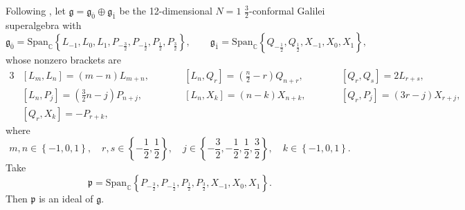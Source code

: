 \documentclass[12pt,reqno]{article}
\def\o{\overline}
\def\F{\mathfrak}
\def\r{\mathrm}
\def\CC{\mathbb{C}}
\def\beqn{\begin{equation*}}
\def\eeqn{\end{equation*}}
\begin{document}
Following \cite{GM}, let $\F{g}=\F{g}_{\o{0}}\oplus\F{g}_{\o{1}}$ be the 12-dimensional $N=1$ $\frac{3}{2}$-conformal Galilei superalgebra with
\beqn
\F{g}_{\bar{0}} =\r{Span}_{\CC}\left\{ L_{-1}, L_0, L_1, P_{-\frac{3}{2}}, P_{-\frac{1}{2}}, P_{\frac{1}{2}}, P_{\frac{3}{2}} \right\},\qquad
\F{g}_{\bar{1}} =\r{Span}_{\CC}\left\{ Q_{-\frac{1}{2}}, Q_{\frac{1}{2}}, X_{-1}, X_0, X_1 \right\},
\eeqn
whose nonzero brackets are
\begin{alignat*}{3}
&[L_m, L_n] = (m-n)L_{m+n},
&\qquad &[L_n, Q_r] = \left(\frac{n}{2} - r\right) Q_{n+r},
&\qquad &[Q_r, Q_s] = 2L_{r+s},
\\
&[L_n, P_j] = \left(\frac{3}{2}n - j\right) P_{n+j},
&\qquad &[L_n, X_k] = (n-k)X_{n+k},
&\qquad &[Q_{r},P_{j}]=(3r-j)X_{r+j},
\\
&[Q_{r},X_{k}]=-P_{r+k},
\end{alignat*}
where 
\beqn
m,n\in \left\{ -1,0,1 \right\}, \quad r,s\in \left\{ -\dfrac{1}{2}, \dfrac{1}{2}\right\}, \quad j \in\left\{ -\dfrac{3}{2},-\dfrac{1}{2}, \dfrac{1}{2},\dfrac{3}{2}\right\}, \quad k\in \left\{ -1,0,1 \right\}.
\eeqn
Take
\beqn
\F{p}=\r{Span}_{\CC}\left\{ P_{-\frac{3}{2}},P_{-\frac{1}{2}},P_{\frac{1}{2}},P_{\frac{3}{2}},X_{-1},X_0,X_1 \right\}.
\eeqn
Then $\F{p}$ is an ideal of $\F{g}$.
\end{document}
